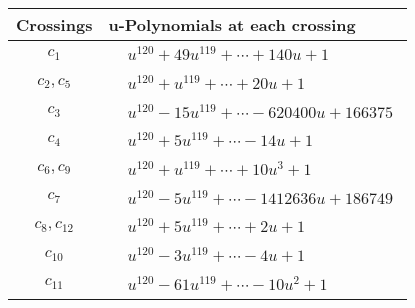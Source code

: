 \documentclass[1p]{elsarticle_modified}
\theoremstyle{definition}
\begin{document}
\begin{tabular}{m{50pt}|m{274pt}}
Crossings & \hspace{64pt}u-Polynomials at each crossing \\
\hline $$\begin{aligned}c_{1}\end{aligned}$$&$\begin{aligned}
&u^{120}+49 u^{119}+\cdots+140 u+1
\end{aligned}$\\
\hline $$\begin{aligned}c_{2},c_{5}\end{aligned}$$&$\begin{aligned}
&u^{120}+u^{119}+\cdots+20 u+1
\end{aligned}$\\
\hline $$\begin{aligned}c_{3}\end{aligned}$$&$\begin{aligned}
&u^{120}-15 u^{119}+\cdots-620400 u+166375
\end{aligned}$\\
\hline $$\begin{aligned}c_{4}\end{aligned}$$&$\begin{aligned}
&u^{120}+5 u^{119}+\cdots-14 u+1
\end{aligned}$\\
\hline $$\begin{aligned}c_{6},c_{9}\end{aligned}$$&$\begin{aligned}
&u^{120}+u^{119}+\cdots+10 u^3+1
\end{aligned}$\\
\hline $$\begin{aligned}c_{7}\end{aligned}$$&$\begin{aligned}
&u^{120}-5 u^{119}+\cdots-1412636 u+186749
\end{aligned}$\\
\hline $$\begin{aligned}c_{8},c_{12}\end{aligned}$$&$\begin{aligned}
&u^{120}+5 u^{119}+\cdots+2 u+1
\end{aligned}$\\
\hline $$\begin{aligned}c_{10}\end{aligned}$$&$\begin{aligned}
&u^{120}-3 u^{119}+\cdots-4 u+1
\end{aligned}$\\
\hline $$\begin{aligned}c_{11}\end{aligned}$$&$\begin{aligned}
&u^{120}-61 u^{119}+\cdots-10 u^2+1
\end{aligned}$\\
\hline
\end{tabular}\newpage\renewcommand{\arraystretch}{1}
\end{document}
